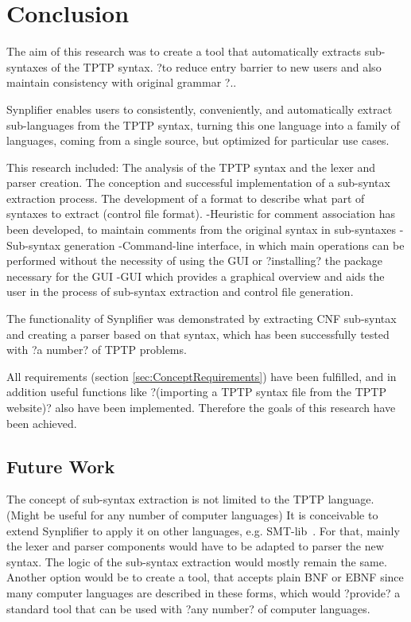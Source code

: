 
\chapter{Conclusion}\label{cha:Conclusion}

The aim of this research was to create a tool that automatically extracts sub-syntaxes of the \ac{TPTP} syntax. ?to reduce entry barrier to new users and also maintain consistency with original grammar  ?..

\ac{Synplifier} enables users to consistently, conveniently, and automatically extract sub-languages from the \ac{TPTP} syntax, turning this one language into a family of languages, coming from a single source, but optimized for particular use cases.

This research included:
The analysis of the \ac{TPTP} syntax and the lexer and parser creation.
The conception and successful implementation of a sub-syntax extraction process.
The development of a format to describe what part of syntaxes to extract (control file format).
-Heuristic for comment association has been developed, to maintain comments from the original syntax in sub-syntaxes
-Sub-syntax generation
-Command-line interface, in which main operations can be performed without the necessity of using the GUI or ?installing? the package necessary for the GUI
-GUI which provides a graphical overview and aids the user in the process of sub-syntax extraction and control file generation.

The functionality of \ac{Synplifier} was demonstrated by extracting \ac{CNF} sub-syntax and creating a parser based on that syntax, which has been successfully tested with ?a number? of \ac{TPTP} problems.

All requirements (section \ref{sec:ConceptRequirements}) have been fulfilled, and in addition useful functions like ?(importing a \ac{TPTP} syntax file from the \ac{TPTP} website)? also have been implemented. Therefore the goals of this research have been achieved.
\section{Future Work}\label{sec:FutureWork}
The concept of sub-syntax extraction is not limited to the \ac{TPTP} language. (Might be useful for any number of computer languages)
It is conceivable to extend \ac{Synplifier} to apply it on other languages, e.g. SMT-lib~\cite{BFT-SMTLIB-17}.
For that, mainly the lexer and parser components would have to be adapted to parser the new syntax. The logic of the sub-syntax extraction would mostly remain the same.\\
Another option would be to create a tool, that accepts plain \ac{BNF} or \ac{EBNF} since many computer languages are described in these forms, which would ?provide? a standard tool that can be used with ?any number? of computer languages.

